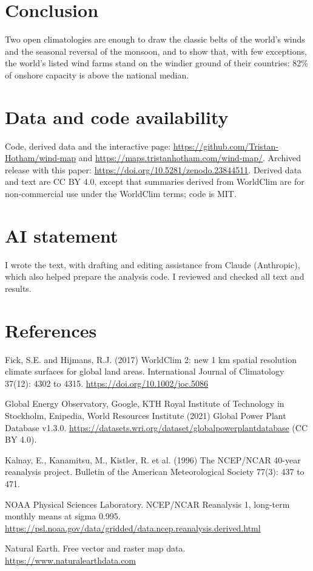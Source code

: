 \documentclass[11pt,a4paper]{article}
\begin{document}
\section{Conclusion}
Two open climatologies are enough to draw the classic belts of the world's winds and the seasonal reversal of the monsoon, and to show that, with few exceptions, the world's listed wind farms stand on the windier ground of their countries: 82\% of onshore capacity is above the national median.

\section*{Data and code availability}
Code, derived data and the interactive page: \url{https://github.com/Tristan-Hotham/wind-map} and \url{https://maps.tristanhotham.com/wind-map/}. Archived release with this paper: \url{https://doi.org/10.5281/zenodo.23844511}. Derived data and text are CC BY 4.0, except that summaries derived from WorldClim are for non-commercial use under the WorldClim terms; code is MIT.

\section*{AI statement}
I wrote the text, with drafting and editing assistance from Claude (Anthropic), which also helped prepare the analysis code. I reviewed and checked all text and results.

\section*{References}
\small
\begin{description}\setlength{\itemsep}{2pt}
\item Fick, S.E. and Hijmans, R.J. (2017) WorldClim 2: new 1 km spatial resolution climate surfaces for global land areas. International Journal of Climatology 37(12): 4302 to 4315. \url{https://doi.org/10.1002/joc.5086}
\item Global Energy Observatory, Google, KTH Royal Institute of Technology in Stockholm, Enipedia, World Resources Institute (2021) Global Power Plant Database v1.3.0. \url{https://datasets.wri.org/dataset/globalpowerplantdatabase} (CC BY 4.0).
\item Kalnay, E., Kanamitsu, M., Kistler, R. et al. (1996) The NCEP/NCAR 40-year reanalysis project. Bulletin of the American Meteorological Society 77(3): 437 to 471.
\item NOAA Physical Sciences Laboratory. NCEP/NCAR Reanalysis 1, long-term monthly means at sigma 0.995. \url{https://psl.noaa.gov/data/gridded/data.ncep.reanalysis.derived.html}
\item Natural Earth. Free vector and raster map data. \url{https://www.naturalearthdata.com}
\end{description}
\end{document}
